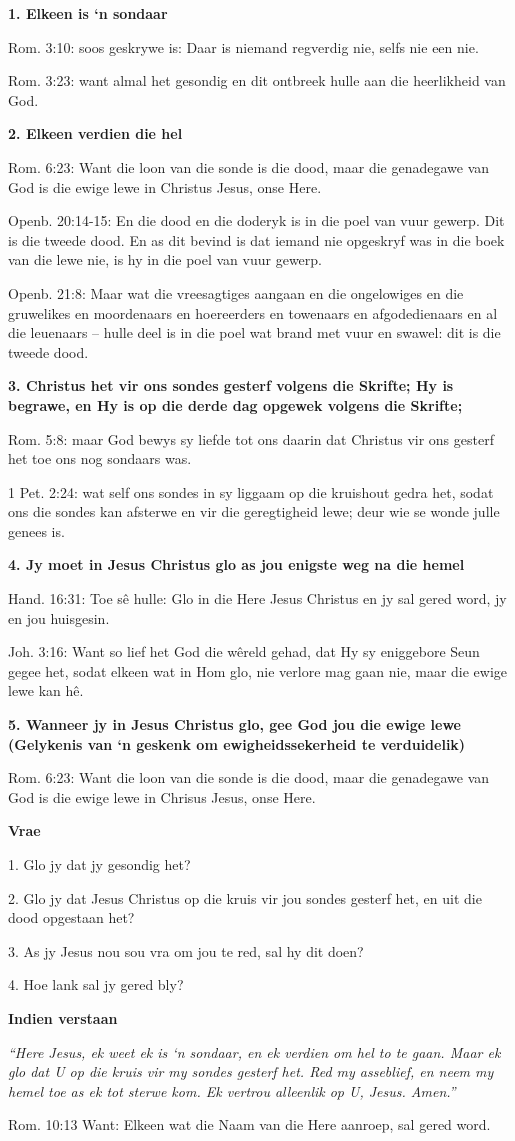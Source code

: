 \textbf{1. Elkeen is ‘n sondaar}

Rom. 3:10: soos geskrywe is: Daar is niemand regverdig nie, selfs nie een nie.

Rom. 3:23: want almal het gesondig en dit ontbreek hulle aan die heerlikheid van God.

\textbf{2. Elkeen verdien die hel}

Rom. 6:23: Want die loon van die sonde is die dood, maar die genadegawe van God is die ewige lewe in Christus Jesus, onse Here.

Openb. 20:14-15: En die dood en die doderyk is in die poel van vuur gewerp. Dit is die tweede dood.  En as dit bevind is dat iemand nie opgeskryf was in die boek van die lewe nie, is hy in die poel van vuur gewerp.

Openb. 21:8: Maar wat die vreesagtiges aangaan en die ongelowiges en die gruwelikes en moordenaars en hoereerders en towenaars en afgodedienaars en al die leuenaars – hulle deel is in die poel wat brand met vuur en swawel: dit is die tweede dood.
       
\textbf{3. Christus het vir ons sondes gesterf volgens die Skrifte; Hy is begrawe, en Hy is op die derde dag opgewek volgens die Skrifte;}

Rom. 5:8: maar God bewys sy liefde tot ons daarin dat Christus vir ons gesterf het toe ons nog sondaars was.

1 Pet. 2:24: wat self ons sondes in sy liggaam op die kruishout gedra het, sodat ons die sondes kan afsterwe en vir die geregtigheid lewe; deur wie se wonde julle genees is.

\textbf{4. Jy moet in Jesus Christus glo as jou enigste weg na die hemel}

Hand. 16:31: Toe sê hulle: Glo in die Here Jesus Christus en jy sal gered word, jy en jou huisgesin.

Joh. 3:16: Want so lief het God die wêreld gehad, dat Hy sy eniggebore Seun gegee het, sodat elkeen wat in Hom glo, nie verlore mag gaan nie, maar die ewige lewe kan hê.

\textbf{5. Wanneer jy in Jesus Christus glo, gee God jou die ewige lewe (Gelykenis van ‘n geskenk om ewigheids­sekerheid te verduidelik)}

Rom. 6:23: Want die loon van die sonde is die dood, maar die genadegawe van God is die ewige lewe in Chrisus Jesus, onse Here.

\textbf{Vrae}

  1. Glo jy dat jy gesondig het?

  2. Glo jy dat Jesus Christus op die kruis vir jou sondes gesterf het, en uit die dood opgestaan het?

  3. As jy Jesus nou sou vra om jou te red, sal hy dit doen?

  4. Hoe lank sal jy gered bly?


\textbf{Indien verstaan}

{\em “Here Jesus, ek weet ek is ‘n sondaar, en ek verdien om hel to te gaan.  Maar ek glo dat U op die kruis vir my sondes gesterf het.  Red my asseblief, en neem my hemel toe as ek tot sterwe kom.  Ek vertrou alleenlik op U, Jesus.  Amen.” }

Rom. 10:13 Want: Elkeen wat die Naam van die Here aanroep, sal gered word.

